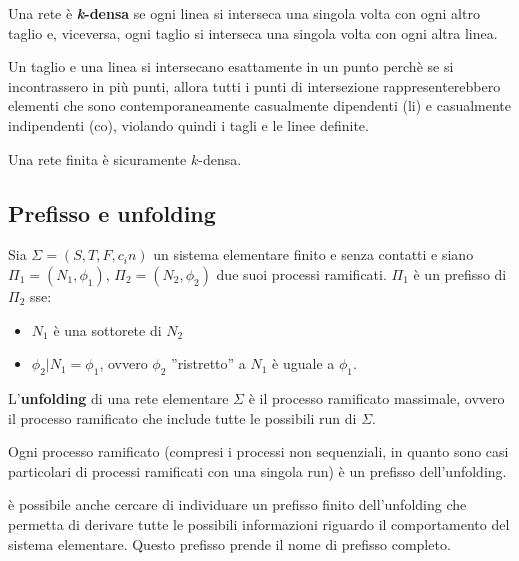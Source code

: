 \begin{defn}
    Una rete è \textbf{\textit{k}-densa} se ogni linea si interseca una singola
    volta con ogni altro taglio e, viceversa, ogni taglio si interseca una
    singola volta con ogni altra linea.
\end{defn}

Un taglio e una linea si intersecano esattamente in un punto perchè se si
incontrassero in più punti, allora tutti i punti di intersezione
rappresenterebbero elementi che sono contemporaneamente casualmente
dipendenti (li) e casualmente indipendenti (co), violando quindi i tagli
e le linee definite.

\begin{rem}
    Una rete finita è sicuramente $k$-densa.
\end{rem}

\subsection*{Prefisso e unfolding}
\begin{defn}
    Sia $\Sigma = (S, T , F , c_in)$ un sistema elementare finito e senza contatti
    e siano $\Pi_1 = (N_1, \phi_1)$, $\Pi_2 = (N_2, \phi_2)$ due suoi processi
    ramificati.
    $\Pi_1$ è un prefisso di $\Pi_2$ sse:
    \begin{itemize}
        \item $N_1$ è una sottorete di $N_2$
        \item $\phi_2|N_1 = \phi_1$, ovvero $\phi_2$ ”ristretto” a $N_1$ è
        uguale a $\phi_1$.
    \end{itemize}
\end{defn}

\begin{defn}
    L'\textbf{unfolding} di una rete elementare $\Sigma$ è il processo ramificato
    massimale, ovvero il processo ramificato che include tutte le possibili
    run di $\Sigma$.
\end{defn}

\begin{rem}
    Ogni processo ramificato (compresi i processi non sequenziali, in quanto
    sono casi particolari di processi ramificati con una singola run) è un
    prefisso dell'unfolding.
\end{rem}

è possibile anche cercare di individuare un prefisso finito dell'unfolding
che permetta di derivare tutte le possibili informazioni riguardo il comportamento
del sistema elementare. Questo prefisso prende il nome di prefisso completo.


